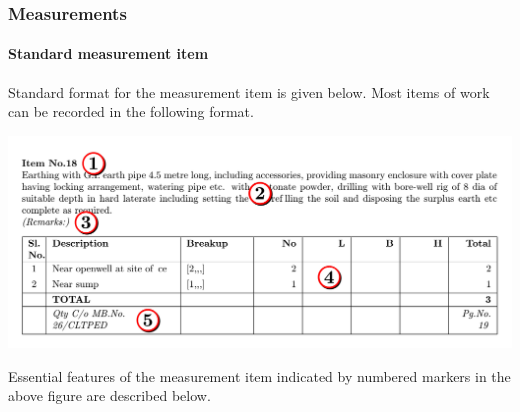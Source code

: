 \documentclass[twoside,a4paper]{refart}
\newenvironment{fminipage}[1]%
{\begin{Sbox}\begin{minipage}{#1}\begin{center}}%
		{\end{center}\end{minipage}\end{Sbox}\shadowbox{\TheSbox}}
\begin{document}
	 \subsubsection{Measurements}
	 
	 \paragraph{Standard measurement item}
	 \label{item:standardmeasitem}
	 Standard format for the measurement item is given below. Most items of work can be recorded in the following format.
	 
	 \begin{maxipage}
	 	\begin{fminipage}{\textwidth}
	 		\includegraphics[width=1\linewidth]{figures/measurementstandard.pdf}
	 	\end{fminipage}
	 \end{maxipage}
	 
	 Essential features of the measurement item indicated by numbered markers in the above figure are described below.
	 
\end{document}
